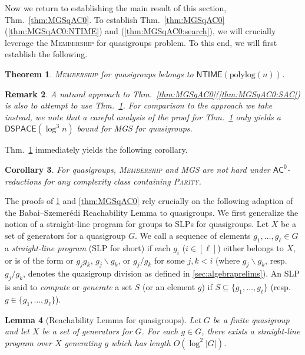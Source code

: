 \documentclass{article}
\newtheorem{theorem}{Theorem}\newtheorem{lemma}[theorem]{Lemma}\newtheorem{proposition}[theorem]{Proposition}\newtheorem{corollary}[theorem]{Corollary}\newtheorem{definition}[theorem]{Definition}\newtheorem{claim}[theorem]{Claim}\newtheorem{remark}[theorem]{Remark}\newtheorem{observation}[theorem]{Observation}\newtheorem{conjecture}[theorem]{Conjecture}\newtheorem{example}[theorem]{Example}
\newcommand{\algprobm}[1]{\textsc{#1}\xspace}
\newcommand{\Thm}[1]{Thm.~\ref{#1}\xspace}
\newcommand*{\ComplexityClass}[1]{\ensuremath{\mathsf{#1}}\xspace}
\newcommand{\ACz}{\ComplexityClass{AC^0}}
\newcommand{\NTIME}{\ComplexityClass{NTIME}}
\begin{document}
Now we return to establishing the main result of this section, \Thm{thm:MGSqAC0}. To establish \Thm{thm:MGSqAC0}(\ref{thm:MGSqAC0:NTIME}) and (\ref{thm:MGSqAC0:search}), we will crucially leverage the \algprobm{Membership} for quasigroups problem. To this end, we will first establish the following.

\begin{theorem}\label{thm:CQMqAC0}
\algprobm{Membership} for quasigroups belongs to $\NTIME(\mathrm{polylog}(n))$.
\end{theorem}

\begin{remark}
 A natural approach to \Thm{thm:MGSqAC0}(\ref{thm:MGSqAC0:SAC}) is also to attempt to use \Thm{thm:CQMqAC0}. For comparison to the approach we take instead, we note that a careful analysis of the proof for \Thm{thm:CQMqAC0} only yields a $\mathsf{DSPACE}(\log^3 n)$ bound for \algprobm{MGS} for quasigroups.
\end{remark}

\Thm{thm:CQMqAC0} immediately yields the following corollary. 

\begin{corollary}
For quasigroups, \algprobm{Membership} and \algprobm{MGS} are not hard under $\ACz$-reductions for any complexity class containing \algprobm{Parity}.
\end{corollary}

The proofs of \cref{thm:CQMqAC0} and \cref{thm:MGSqAC0} rely crucially on the following adaption of the Babai--Szemer\'edi  Reachability Lemma \cite[Theorem~3.1]{BabaiSzemeredi} to quasigroups. We first generalize the notion of a straight-line program for groups \cite{BabaiSzemeredi} to SLPs for quasigroups. Let $X$ be a set of generators for a quasigroup $G$. We call a sequence of elements $g_{1}, \ldots, g_{\ell} \in G$ a \textit{straight-line program} (SLP for short) if each $g_{i}$ ($i \in [\ell]$) either belongs to $X$, or is of the form or $g_{j}g_{k}$, $g_{j}\backslash g_{k}$, or $g_{j}/ g_{k}$ for some $j, k < i$ (where $g_{j}\backslash g_{k}$, resp. $g_{j}/ g_{k}$, denotes the quasigroup division as defined in \cref{sec:algebraprelims}). An SLP is said to \emph{compute} or \emph{generate} a set $S$ (or an element $g$) if $S \subseteq \{g_1, \dots, g_\ell\}$ (resp.\ $g\in\{g_1, \dots, g_\ell\}$).

\begin{lemma}[Reachability Lemma for quasigroups] \label{lem:Reachability}
Let $G$ be a finite quasigroup and let $X$ be a set of generators for $G$. For each $g \in G$, there exists a straight-line program over $X$ generating $g$ which has length $O(\log^2 |G|)$.
\end{lemma}
\end{document}
